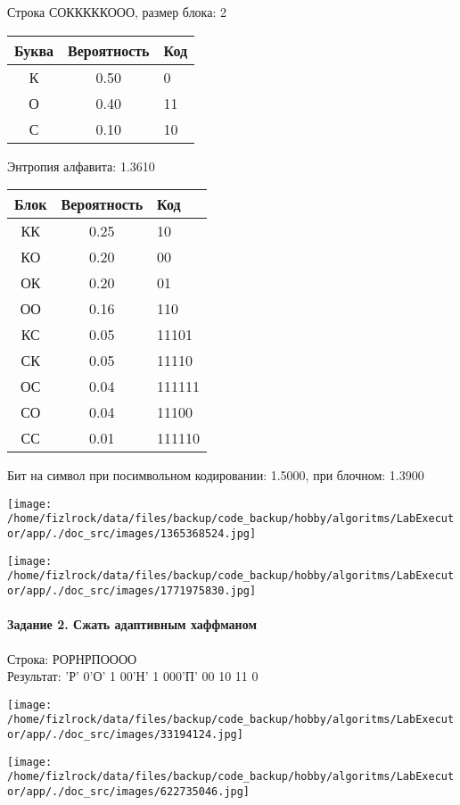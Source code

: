 \documentclass[a4paper, 12pt]{article}
\begin{document}
Строка СОКККККООО, размер блока: 2
\begin{center}
 \begin{tabular}{ |c|c|l| } 
  \hline
     Буква & Вероятность & Код\\ \hline
К & 0.50 & 0\\\hline
О & 0.40 & 11\\\hline
С & 0.10 & 10
\\ \hline \end{tabular}
\end{center}
Энтропия алфавита: 1.3610
\begin{center}
 \begin{tabular}{ |c|c|l| } 
  \hline
     Блок & Вероятность & Код\\ \hline
КК & 0.25 & 10\\\hline
КО & 0.20 & 00\\\hline
ОК & 0.20 & 01\\\hline
ОО & 0.16 & 110\\\hline
КС & 0.05 & 11101\\\hline
СК & 0.05 & 11110\\\hline
ОС & 0.04 & 111111\\\hline
СО & 0.04 & 11100\\\hline
СС & 0.01 & 111110
\\ \hline \end{tabular}
\end{center}
Бит на символ при посимвольном кодировании: 1.5000, при блочном: 1.3900

\texttt{[image: /home/fizlrock/data/files/backup/code\_backup/hobby/algoritms/LabExecutor/app/./doc\_src/images/1365368524.jpg]}

\texttt{[image: /home/fizlrock/data/files/backup/code\_backup/hobby/algoritms/LabExecutor/app/./doc\_src/images/1771975830.jpg]}
\pagebreak
\paragraph{Задание 2. Сжать адаптивным хаффманом\\}

Строка: 
РОРНРПОООО\\
Результат: 'Р' 0'О' 1 00'Н' 1 000'П' 00 10 11 0

\texttt{[image: /home/fizlrock/data/files/backup/code\_backup/hobby/algoritms/LabExecutor/app/./doc\_src/images/33194124.jpg]}

\texttt{[image: /home/fizlrock/data/files/backup/code\_backup/hobby/algoritms/LabExecutor/app/./doc\_src/images/622735046.jpg]}
\end{document}

